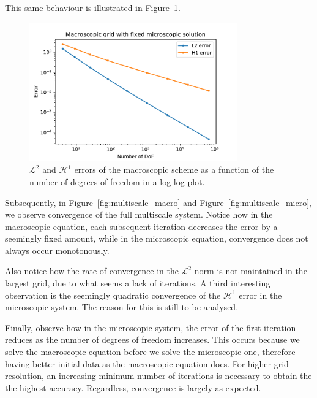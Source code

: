 \documentclass{article}
\renewcommand{\L}{\mathcal{ L}}
\renewcommand{\H}{\mathcal{ H}}
\begin{document}
This same behaviour is illustrated in Figure~\ref{fig:macro_convergence}.

\begin{figure}[ht]
    \centering
    \includegraphics[width=0.8\textwidth]{macro_convergence.pdf}
    \caption{$\L^2$ and $\H^1$ errors of the macroscopic scheme as a function of the number of degrees of freedom in a log-log plot.}
    \label{fig:macro_convergence}
\end{figure}

Subsequently, in Figure~\ref{fig:multiscale_macro} and Figure~\ref{fig:multiscale_micro}, we observe convergence of the full multiscale system.
Notice how in the macroscopic equation, each subsequent iteration decreases the error by a seemingly fixed amount, while in the microscopic equation, convergence does not always occur monotonously.

Also notice how the rate of convergence in the $\L^2$ norm is not maintained in the largest grid, due to what seems a lack of iterations.
A third interesting observation is the seemingly quadratic convergence of the $\H^1$ error in the microscopic system. The reason for this is still to be analysed.

Finally, observe how in the microscopic system, the error of the first iteration reduces as the number of degrees of freedom increases. This occurs because we solve the macroscopic equation before we solve the microscopic one, therefore having better initial data as the macroscopic equation does.
For higher grid resolution, an increasing minimum number of iterations is necessary to obtain the the highest accuracy. Regardless, convergence is largely as expected.
\end{document}
